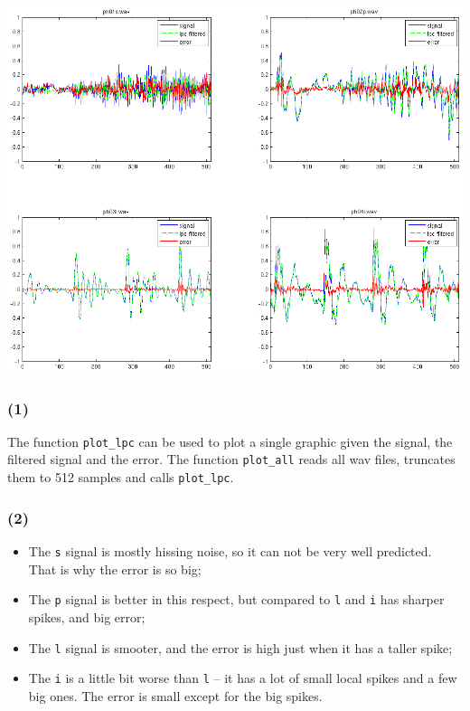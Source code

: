 \documentclass[a4paper]{article}
\newcommand{\TT}[1] {\texttt{#1}}
\begin{document}
\includegraphics[scale=0.45]{sig_lpc_err2.png}

\subsubsection*{(1)}

The function \TT{plot\_lpc} can be used to plot a single graphic given the
signal, the filtered signal and the error. The function \TT{plot\_all} reads
all wav files, truncates them to 512 samples and calls \TT{plot\_lpc}.

\subsubsection*{(2)}

\begin{itemize}
  \item The \TT{s} signal is mostly hissing noise, so it can not be very well
  predicted. That is why the error is so big; \\
  \item The \TT{p} signal is better in this respect, but compared to \TT{l} and
  \TT{i} has sharper spikes, and big error; \\
  \item The \TT{l} signal is smooter, and the error is high just when it has
  a taller spike; \\
  \item The \TT{i} is a little bit worse than \TT{l} -- it has a lot of small
  local spikes and a few big ones. The error is small except for the big
  spikes. \\
\end{itemize}
\end{document}
